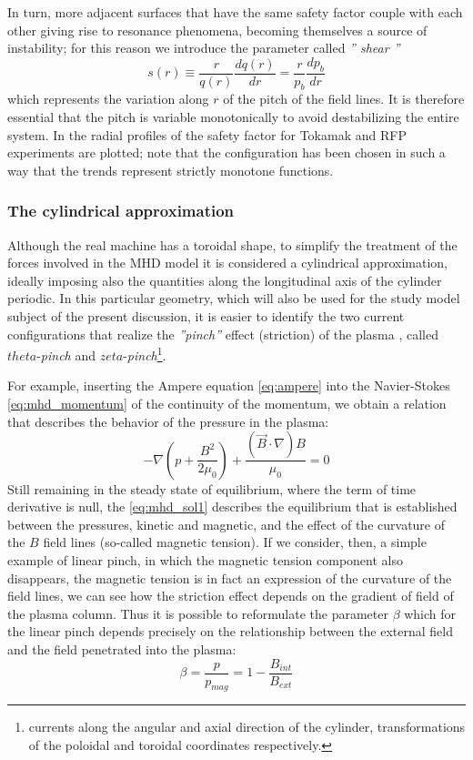 In turn, more adjacent surfaces that have the same safety factor couple with each other giving rise to resonance phenomena, becoming themselves a source of instability; for this reason we introduce the parameter called \emph{'' shear ''}
%
\begin{equation}
 s(r) \equiv \frac{r}{q(r)}\frac{dq(r)}{dr} = \frac{r}{p_b}\frac{dp_b}{dr}
\end{equation}
%
which represents the variation along $r$ of the pitch of the field lines. It is therefore essential that the pitch is variable monotonically to avoid destabilizing the entire system.
In \Figure{\ref{fig:profiles-tokarfp}} the radial profiles of the safety factor for Tokamak and RFP experiments are plotted; note that the configuration has been chosen in such a way that the trends represent strictly monotone functions.

\subsubsection{The cylindrical approximation}

Although the real machine has a toroidal shape, to simplify the treatment of the forces involved in the MHD model it is considered a cylindrical approximation, ideally imposing also the quantities along the longitudinal axis of the cylinder periodic. In this particular geometry, which will also be used for the study model subject of the present discussion, it is easier to identify the two current configurations that realize the  \emph{''pinch''} effect (striction) of the plasma \cite{fridberg}\cite{ortolani}, called $theta$-\emph{pinch} and $zeta$-\emph{pinch}\footnote{currents along the angular and axial direction of the cylinder, transformations of the poloidal and toroidal coordinates respectively.}.

For example, inserting the Ampere equation \eqref{eq:ampere} into the Navier-Stokes \eqref{eq:mhd_momentum} of the continuity of the momentum, we obtain a relation that describes the behavior of the pressure in the plasma:
\begin{equation}
 \label{eq:mhd_sol1}
 -\nabla \left( p+\frac{B^2}{2\mu_0} \right) + \frac{
  (\Vec{B}\cdot\nabla)B}{\mu_0} = 0
\end{equation}
Still remaining in the steady state of equilibrium, where the term of time derivative is null, the \eqref{eq:mhd_sol1} describes the equilibrium that is established between the pressures, kinetic and magnetic, and the effect of the curvature of the ${B}$ field lines (so-called magnetic tension). If we consider, then, a simple example of linear pinch, in which the magnetic tension component also disappears, the magnetic tension is in fact an expression of the curvature of the field lines, we can see how the striction effect depends on the gradient of field of the plasma column. Thus it is possible to reformulate the parameter $ \beta $ which for the linear pinch depends precisely on the relationship between the external field and the field penetrated into the plasma:
\begin{equation}
\beta = \frac{p}{p_{mag}} = 1-\frac{B_{int}}{B_{ext}}
\end{equation}



